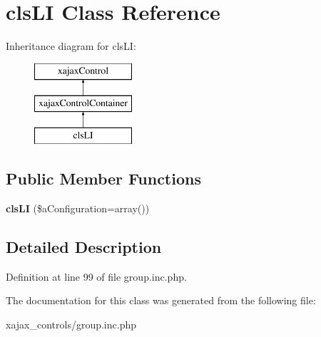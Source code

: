\hypertarget{classclsLI}{
\section{clsLI Class Reference}
\label{classclsLI}
}
Inheritance diagram for clsLI:\begin{figure}[H]
\begin{center}
\leavevmode
\includegraphics[height=3.000000cm]{classclsLI}
\end{center}
\end{figure}
\subsection*{Public Member Functions}
\begin{DoxyCompactItemize}
\item 
\hypertarget{classclsLI_a2f1557cc54a751f6874a81d18828b911}{
{\bfseries clsLI} (\$aConfiguration=array())}
\label{classclsLI_a2f1557cc54a751f6874a81d18828b911}

\end{DoxyCompactItemize}


\subsection{Detailed Description}


Definition at line 99 of file group.inc.php.



The documentation for this class was generated from the following file:\begin{DoxyCompactItemize}
\item 
xajax\_\-controls/group.inc.php\end{DoxyCompactItemize}
